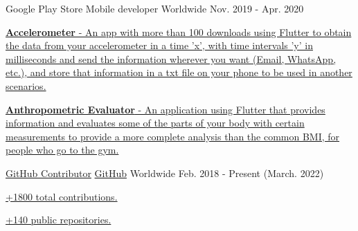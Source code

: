 \begin{cventries}
  \cventry
    {Google Play Store} %
    {Mobile developer} %
    {Worldwide} %
    {Nov. 2019 - Apr. 2020} %
    {
      \begin{cvitems} %
        \item {\href{https://play.google.com/store/apps/details?id=com.grisu.accelerometer}{
        \textbf{Accelerometer} - An app with more than 100 downloads using Flutter to obtain the data from your accelerometer
        in a time 'x', with time intervals 'y' in milliseconds and send the information wherever you
        want (Email, WhatsApp, etc.), and store that information in a txt file on your phone to be
        used in another scenarios.}}
        \item {\href{https://play.google.com/store/apps/details?id=com.grisu.anthropometric_evaluator}{
          \textbf{Anthropometric Evaluator} - An application using Flutter that provides information
          and evaluates some of the parts of your body with certain measurements to provide a more
          complete analysis than the common BMI, for people who go to the gym.}}
      \end{cvitems}
    }

  \cventry
    {\href{https://github.com/Youngermaster}{GitHub Contributor}} %
    {\href{https://github.com/Youngermaster}{GitHub}} %
    {Worldwide} %
    {Feb. 2018 - Present (March. 2022)} %
    {
      \begin{cvitems} %
        \item {\href{https://github.com/Youngermaster}{+1800 total contributions.}}
        \item {\href{https://github.com/Youngermaster}{+140 public repositories.}}
      \end{cvitems}
    }

\end{cventries}
